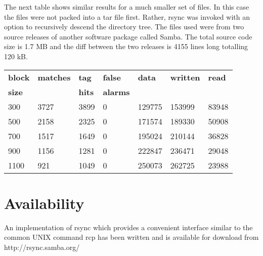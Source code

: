 \documentclass[a4paper]{article}
\begin{document}
The next table shows similar results for a much smaller set of files.
In this case the files were not packed into a tar file first. Rather,
rsync was invoked with an option to recursively descend the directory
tree. The files used were from two source releases of another software
package called Samba. The total source code size is 1.7 MB and the
diff between the two releases is 4155 lines long totalling 120 kB.

\vspace*{5mm}
\begin{tabular}{|l|l|l|l|l|l|l|} \hline
{\bf block} & {\bf matches} & {\bf tag}  & {\bf false}  & {\bf data} & {\bf written}  & {\bf read} \\
{\bf size}  &               & {\bf hits} & {\bf alarms} &            &                &            \\ \hline \hline

300         & 3727          & 3899       & 0            & 129775     & 153999         & 83948       \\ \hline
500         & 2158          & 2325       & 0            & 171574     & 189330         & 50908       \\ \hline
700         & 1517          & 1649       & 0            & 195024     & 210144         & 36828        \\ \hline
900         & 1156          & 1281       & 0            & 222847     & 236471         & 29048        \\ \hline
1100        & 921           & 1049       & 0            & 250073     & 262725         & 23988        \\ \hline
\end{tabular}
\vspace*{5mm}


\section{Availability}

An implementation of rsync which provides a convenient interface
similar to the common UNIX command rcp has been written and is
available for download from http://rsync.samba.org/
\end{document}
